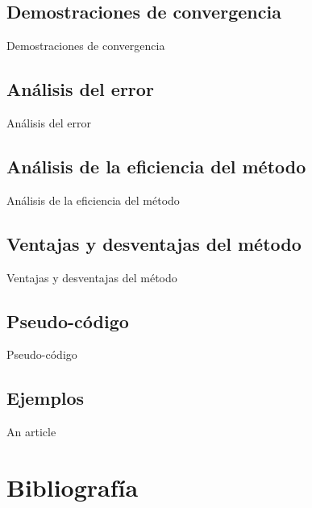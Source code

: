 \documentclass[journal,transmag]{IEEEtran}
\theoremstyle{mytheoremstyle}
\theoremstyle{mytheoremstyle}
\theoremstyle{myproblemstyle}
\begin{document}
\subsection{Demostraciones de convergencia}
\begin{lipsum}
    Demostraciones de convergencia
\end{lipsum}
\subsection{Análisis del error}
\begin{lipsum}
    Análisis del error
\end{lipsum}
\subsection{Análisis de la eficiencia del método}
\begin{lipsum}
    Análisis de la eficiencia del método
\end{lipsum}
\subsection{Ventajas y desventajas del método}
\begin{lipsum}
    Ventajas y desventajas del método
\end{lipsum}
\subsection{Pseudo-código}
\begin{lipsum}
    Pseudo-código
\end{lipsum}
\subsection{Ejemplos}
\begin{lipsum}
    An article \cite{anarticle}
\end{lipsum}
\newpage
\section{Bibliografía}


\end{document}
